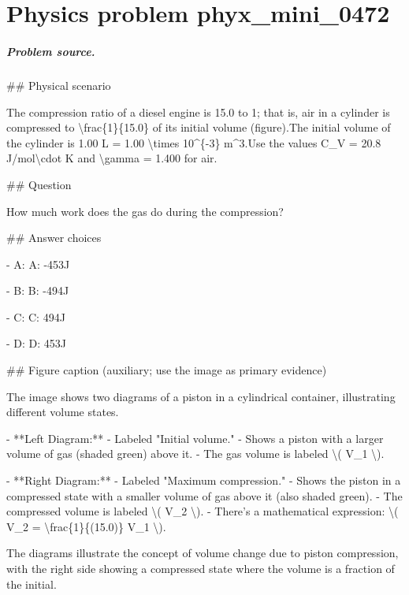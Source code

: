 
\chapter{Physics problem phyx\_mini\_0472}
\label{ch:PhyXMiniProblems_problem_phyx_mini_0472}

\paragraph{Problem source.}
\#\# Physical scenario

The compression ratio of a diesel engine is 15.0 to 1; that is, air in a cylinder is compressed to \textbackslash{}frac\{1\}\{15.0\} of its initial volume (figure).The initial volume of the cylinder is 1.00 L = 1.00 \textbackslash{}times 10\textasciicircum{}\{-3\} m\textasciicircum{}3.Use the values C\_V = 20.8 J/mol\textbackslash{}cdot K and \textbackslash{}gamma = 1.400 for air.

\#\# Question

How much work does the gas do during the compression?

\#\# Answer choices

- A: A: -453J

- B: B: -494J

- C: C: 494J

- D: D: 453J

\#\# Figure caption (auxiliary; use the image as primary evidence)

The image shows two diagrams of a piston in a cylindrical container, illustrating different volume states.

- **Left Diagram:**
  - Labeled "Initial volume."
  - Shows a piston with a larger volume of gas (shaded green) above it.
  - The gas volume is labeled \textbackslash{}( V\_1 \textbackslash{}).

- **Right Diagram:**
  - Labeled "Maximum compression."
  - Shows the piston in a compressed state with a smaller volume of gas above it (also shaded green).
  - The compressed volume is labeled \textbackslash{}( V\_2 \textbackslash{}).
  - There’s a mathematical expression: \textbackslash{}( V\_2 = \textbackslash{}frac\{1\}\{(15.0)\} V\_1 \textbackslash{}).

The diagrams illustrate the concept of volume change due to piston compression, with the right side showing a compressed state where the volume is a fraction of the initial.

